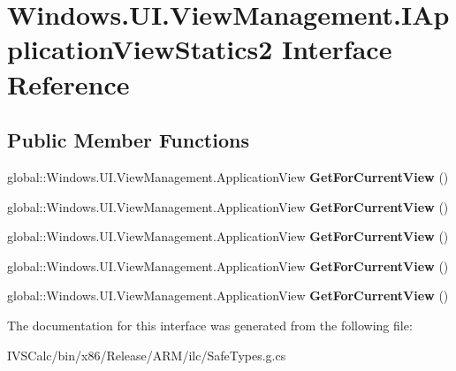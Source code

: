 \hypertarget{interface_windows_1_1_u_i_1_1_view_management_1_1_i_application_view_statics2}{}\section{Windows.\+U\+I.\+View\+Management.\+I\+Application\+View\+Statics2 Interface Reference}
\label{interface_windows_1_1_u_i_1_1_view_management_1_1_i_application_view_statics2}
\subsection*{Public Member Functions}
\begin{DoxyCompactItemize}
\item 
\mbox{\label{interface_windows_1_1_u_i_1_1_view_management_1_1_i_application_view_statics2_a0e14763e032da60ba82eb2229c326a1e}} 
global\+::\+Windows.\+U\+I.\+View\+Management.\+Application\+View {\bfseries Get\+For\+Current\+View} ()
\item 
\mbox{\label{interface_windows_1_1_u_i_1_1_view_management_1_1_i_application_view_statics2_a0e14763e032da60ba82eb2229c326a1e}} 
global\+::\+Windows.\+U\+I.\+View\+Management.\+Application\+View {\bfseries Get\+For\+Current\+View} ()
\item 
\mbox{\label{interface_windows_1_1_u_i_1_1_view_management_1_1_i_application_view_statics2_a0e14763e032da60ba82eb2229c326a1e}} 
global\+::\+Windows.\+U\+I.\+View\+Management.\+Application\+View {\bfseries Get\+For\+Current\+View} ()
\item 
\mbox{\label{interface_windows_1_1_u_i_1_1_view_management_1_1_i_application_view_statics2_a0e14763e032da60ba82eb2229c326a1e}} 
global\+::\+Windows.\+U\+I.\+View\+Management.\+Application\+View {\bfseries Get\+For\+Current\+View} ()
\item 
\mbox{\label{interface_windows_1_1_u_i_1_1_view_management_1_1_i_application_view_statics2_a0e14763e032da60ba82eb2229c326a1e}} 
global\+::\+Windows.\+U\+I.\+View\+Management.\+Application\+View {\bfseries Get\+For\+Current\+View} ()
\end{DoxyCompactItemize}


The documentation for this interface was generated from the following file\+:\begin{DoxyCompactItemize}
\item 
I\+V\+S\+Calc/bin/x86/\+Release/\+A\+R\+M/ilc/Safe\+Types.\+g.\+cs\end{DoxyCompactItemize}
